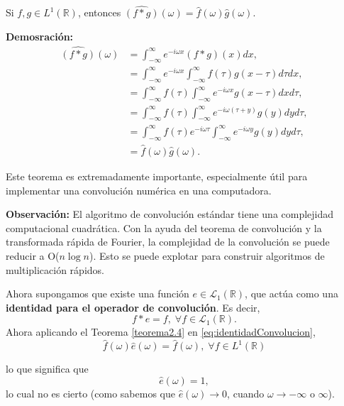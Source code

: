 \begin{multicols}{2}
\begin{teorema}
    Si $f, g \in L^1(\mathbb{R})$, entonces $\hat{(f * g)}(\omega) = \hat{f}(\omega) \hat{g}(\omega)$.

    \textbf{Demosración:}
    \begin{align*}
    \hat{(f * g)}(\omega) &= \int_{-\infty}^{\infty} e^{-i\omega x} (f * g)(x) dx, \\
    &= \int_{-\infty}^{\infty} e^{-i\omega x} \int_{-\infty}^{\infty} f(\tau) g(x - \tau) d\tau dx, \\
    &= \int_{-\infty}^{\infty} f(\tau) \int_{-\infty}^{\infty} e^{-i\omega x} g(x - \tau) dx d\tau, \\
    &= \int_{-\infty}^{\infty} f(\tau) \int_{-\infty}^{\infty} e^{-i\omega (\tau + y)} g(y) dy d\tau, \\
    &= \int_{-\infty}^{\infty} f(\tau) e^{-i\omega \tau} \int_{-\infty}^{\infty} e^{-i\omega y} g(y) dy d\tau, \\
    &= \hat{f}(\omega) \hat{g}(\omega).
    \end{align*}
\label{teorema2.4}
\end{teorema}

Este teorema es extremadamente importante, especialmente útil para implementar una convolución numérica en una computadora.


\textbf{Observación:} \; El algoritmo de convolución estándar tiene una complejidad computacional cuadrática. Con la ayuda del teorema de convolución y la transformada rápida de Fourier, la complejidad de la convolución se puede reducir a O($n \log n$). Esto se puede explotar para construir algoritmos de multiplicación rápidos.

Ahora supongamos que existe una función $e \in \mathcal{L}_1(\mathbb{R})$, que actúa como una \textbf{identidad para el operador de convolución}. Es decir, 
\begin{equation}
	f * e = f,\; \forall f \in \mathcal{L}_1(\mathbb{R}).
\label{eq:identidadConvolucion}
\end{equation}
Ahora aplicando el Teorema \ref{teorema2.4} en \ref{eq:identidadConvolucion}, 
$$\hat{f}(\omega) \hat{e}(\omega) = \hat{f}(\omega), \;\forall f \in L^1(\mathbb{R})$$ 

lo que significa que 
\begin{equation}
	\hat{e}(\omega) = 1,
\label{eq:identidadConvolucion2}
\end{equation}
lo cual no es cierto (como sabemos que $\hat{e}(\omega) \rightarrow 0$, cuando $\omega \rightarrow -\infty$ o $\infty$).



\end{multicols}
